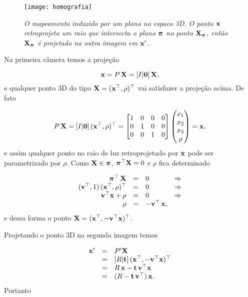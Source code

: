 \begin{figure}[!htb]
\centering
\texttt{[image: homografia]}
\caption{\textit{O mapeamento induzido por um plano no espaco 3D. O ponto $\mathbf{x}$ retroprojeta um raio que intersecta o plano $\boldsymbol{\pi}$ no ponto $\mathbf{X}_{\boldsymbol{\pi}}$, então $\mathbf{X}_{\boldsymbol{\pi}}$ é projetado na outra imagem em $\mathbf{x}'$.}}
\label{fig.homografia}
\end{figure}




Na primeira câmera temos a projeção

\begin{equation*}
\mathbf{x}=P\,\mathbf{X}=[I|{\bf 0}]\,\mathbf{X},
\end{equation*}
e qualquer ponto 3D do tipo $\mathbf{X}=(\mathbf{x}^\top,\rho)^\top$ vai satisfazer a projeção acima. De fato

\begin{equation*}
P\,\mathbf{X}=
[I|{\bf 0}]\,(\mathbf{x}^\top,\rho)^\top=
\begin{bmatrix}
1&0&0&0\\
0&1&0&0\\
0&0&1&0
\end{bmatrix}
\begin{pmatrix}
x_1\\
x_2\\
x_3\\
\rho
\end{pmatrix}
=\mathbf{x},
\end{equation*}
e assim qualquer ponto no raio de luz retroprojetado por $\mathbf{x}$ pode ser parametrizado por $\rho$. Como $\mathbf{X}\in\boldsymbol{\pi}$, $\boldsymbol{\pi}^\top\mathbf{X}=0$ e  
$\rho$ fica determinado

\begin{equation*}
\begin{array}{rcll}
\boldsymbol{\pi}^\top\,\mathbf{X}&=&0&\Rightarrow\\
({\bf v}^\top,1)\,(\mathbf{x}^\top,\rho)^\top&=&0&\Rightarrow\\
{\bf v}^\top\mathbf{x}+\rho&=&0&\Rightarrow\\
\rho&=&-{\bf v}^\top\,\mathbf{x},&
\end{array}
\end{equation*}
e dessa forma o ponto $\mathbf{X}=(\mathbf{x}^\top,-{\bf v}^\top\mathbf{x})^\top$.

Projetando o ponto 3D na segunda imagem temos

\begin{equation*}
\begin{array}{rcl}
\mathbf{x}'&=&P'\mathbf{X}\\
&=&[R|{\bf t}]\,(\mathbf{x}^\top,-{\bf v}^\top\mathbf{x})^\top\\
&=&R\,\mathbf{x}-{\bf t}\,{\bf v}^\top\mathbf{x}\\
&=&(R-{\bf t}\,{\bf v}^\top)\,\mathbf{x}.
\end{array}
\end{equation*}
Portanto

